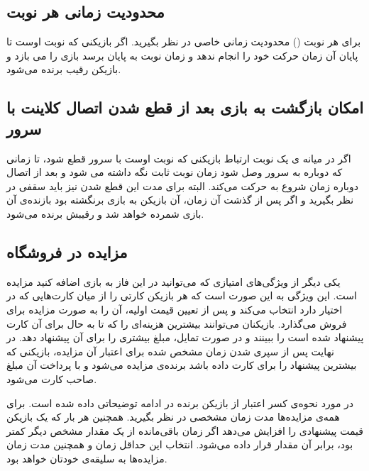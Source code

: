 \documentclass[]{article}
\begin{document}
\subsection*{{\titr محدودیت زمانی هر نوبت}}

برای هر نوبت () محدودیت زمانی خاصی در نظر بگیرید. اگر بازیکنی که نوبت اوست تا پایان آن زمان حرکت خود را انجام ندهد و زمان نوبت به پایان برسد بازی را می بازد و بازیکن رقیب برنده می‌شود.

\subsection*{{\titr امکان بازگشت به بازی بعد از قطع شدن اتصال کلاینت با سرور}}

اگر در میانه ی یک نوبت ارتباط بازیکنی که نوبت اوست با سرور قطع شود، تا زمانی که دوباره به سرور وصل شود زمان نوبت ثابت نگه داشته می شود و بعد از اتصال دوباره زمان شروع به حرکت می‌کند. البته برای مدت این قطع شدن نیز باید سقفی در نظر بگیرید و اگر پس از گذشت آن زمان، آن بازیکن به بازی برنگشته بود بازنده‌ی آن بازی شمرده خواهد شد و رقیبش برنده می‌شود.

\subsection*{{\titr مزایده در فروشگاه}}

یکی دیگر از ویژگی‌های امتیازی که می‌توانید در این فاز به بازی اضافه کنید مزایده است. این ویژگی به این صورت است که هر بازیکن کارتی را از میان کارت‌هایی که در اختیار دارد انتخاب می‌کند و پس از تعیین قیمت اولیه، آن را به صورت مزایده برای فروش می‌گذارد. بازیکنان می‌توانند بیشترین هزینه‌ای را که تا به حال برای آن کارت پیشنهاد شده است را ببینند و در صورت تمایل، مبلغ بیشتری را برای آن پیشنهاد دهد. در نهایت پس از سپری شدن زمان مشخص شده برای اعتبار آن مزایده، بازیکنی که بیشترین پیشنهاد را برای کارت داده باشد برنده‌ی مزایده می‌شود و با پرداخت آن مبلغ صاحب کارت می‌شود. 

در مورد نحوه‌ی کسر اعتبار از بازیکن برنده در ادامه توضیحاتی ‌داده شده است. برای همه‌ی مزایده‌ها مدت زمان مشخصی در نظر بگیرید. همچنین هر بار که یک بازیکن قیمت پیشنهادی را افزایش می‌دهد اگر زمان باقی‌مانده از یک مقدار مشخص دیگر کمتر بود، برابر آن مقدار قرار داده می‌شود. انتخاب این حداقل زمان و همچنین مدت زمان مزایده‌ها به سلیقه‌ی خودتان خواهد بود.
\end{document}
